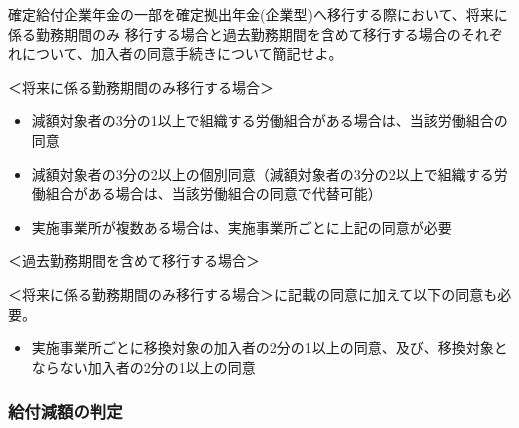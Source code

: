 \begin{shortanswer}[年金1 \ H19 \ 問題2(1)（改題）]
  確定給付企業年金の一部を確定拠出年金(企業型)へ移行する際において、将来に係る勤務期間のみ
  移行する場合と過去勤務期間を含めて移行する場合のそれぞれについて、加入者の同意手続きについて簡記せよ。
\end{shortanswer}

\begin{answerbox}
  ＜将来に係る勤務期間のみ移行する場合＞

  \begin{itemize}
    \item 減額対象者の3分の1以上で組織する労働組合がある場合は、当該労働組合の同意
    \item 減額対象者の3分の2以上の個別同意（減額対象者の3分の2以上で組織する労働組合がある場合は、当該労働組合の同意で代替可能）
    \item 実施事業所が複数ある場合は、実施事業所ごとに上記の同意が必要
  \end{itemize}

  ＜過去勤務期間を含めて移行する場合＞

  
  ＜将来に係る勤務期間のみ移行する場合＞に記載の同意に加えて以下の同意も必要。
  \begin{itemize}
    \item 実施事業所ごとに移換対象の加入者の2分の1以上の同意、及び、移換対象とならない加入者の2分の1以上の同意
  \end{itemize}
\end{answerbox}

\newpage

\subsubsection{給付減額の判定}

